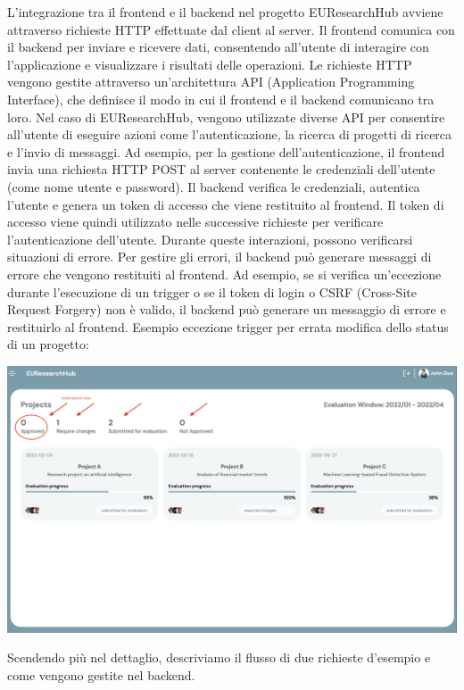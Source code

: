 \documentclass{report}
\begin{document}
L'integrazione tra il frontend e il backend nel progetto EUResearchHub avviene attraverso richieste HTTP effettuate dal client al server. Il frontend comunica con il backend per inviare e ricevere dati, consentendo all'utente di interagire con l'applicazione e visualizzare i risultati delle operazioni.
Le richieste HTTP vengono gestite attraverso un'architettura API (Application Programming Interface), che definisce il modo in cui il frontend e il backend comunicano tra loro. Nel caso di EUResearchHub, vengono utilizzate diverse API per consentire all'utente di eseguire azioni come l'autenticazione, la ricerca di progetti di ricerca e l'invio di messaggi.
Ad esempio, per la gestione dell'autenticazione, il frontend invia una richiesta HTTP POST al server contenente le credenziali dell'utente (come nome utente e password). Il backend verifica le credenziali, autentica l'utente e genera un token di accesso che viene restituito al frontend. Il token di accesso viene quindi utilizzato nelle successive richieste per verificare l'autenticazione dell'utente.
Durante queste interazioni, possono verificarsi situazioni di errore. Per gestire gli errori, il backend può generare messaggi di errore che vengono restituiti al frontend. Ad esempio, se si verifica un'eccezione durante l'esecuzione di un trigger o se il token di login o CSRF (Cross-Site Request Forgery) non è valido, il backend può generare un messaggio di errore e restituirlo al frontend. 
Esempio eccezione trigger per errata modifica dello status di un progetto:
\begin{center}
\includegraphics[scale = 0.04]{4.png}
\end{center}
Scendendo più nel dettaglio, descriviamo il flusso di due richieste d'esempio e come vengono gestite nel backend.\\
\end{document}
